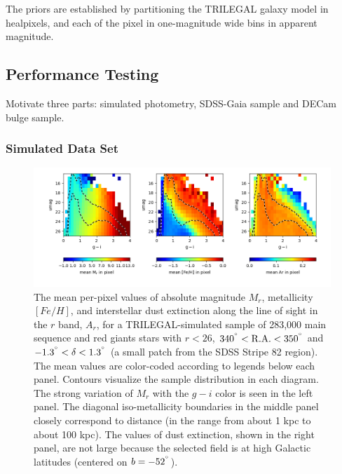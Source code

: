 The priors are established by partitioning the TRILEGAL galaxy model
\citep{dal_tio_simulating_2022} in healpixels,
and each of the pixel in one-magnitude wide bins in apparent
magnitude.


\subsection{Performance Testing} 

Motivate three parts: simulated photometry, SDSS-Gaia sample and DECam bulge sample. 


\subsubsection{Simulated Data Set}

\begin{figure}[ht!]
\hskip -0.3in
\includegraphics[width=1.08\textwidth,angle=0]{figures/qpBmeans_SDSSpatchRA340-350-simLSST_FeH.png}
\vskip -0.3in
\caption{The mean per-pixel values of absolute magnitude $M_r$,
  metallicity $[Fe/H]$, and interstellar dust extinction along the line of sight in
  the $r$ band, $A_r$, for a TRILEGAL-simulated sample of 283,000 main
  sequence and red giants stars with $r<26$, $340^{\degree} < {\rm R.A.} < 350^{\degree}$
  and $-1.3^{\degree} < \delta < 1.3^{\degree}$
  (a small patch from the SDSS Stripe 82 region). The mean values are
  color-coded according to legends below each panel. Contours
  visualize the sample distribution in each diagram. The strong variation
  of $M_r$ with the $g-i$ color is seen in the left panel. The
  diagonal iso-metallicity boundaries in the middle panel closely correspond to distance
  (in the range from about 1 kpc to about 100 kpc). The values of
  dust extinction, shown in the right panel, are not large because the
  selected field is at high Galactic latitudes (centered on $b = -52^{\degree}$).}
\label{fig:qpBmeans}
\end{figure}


